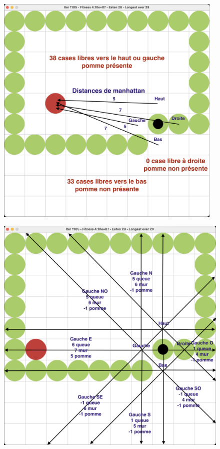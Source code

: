 \documentclass[10pt]{beamer}
\begin{document}
\begin{frame}
\begin{columns}[T]
\begin{column}{0.24\textwidth}
\begin{figure}
\vspace{-0.8cm}\hspace{-0.6cm}
\includegraphics[width=0.97\textwidth]{snake_vision_illustration.png}
\end{figure}  

\begin{figure}
\vspace{-1.1cm}\hspace{-0.6cm}
\includegraphics[width=1\textwidth]{snake_vision_illustration2.png}
\end{figure}


\end{column}
\end{columns}
\end{frame}
\end{document}
